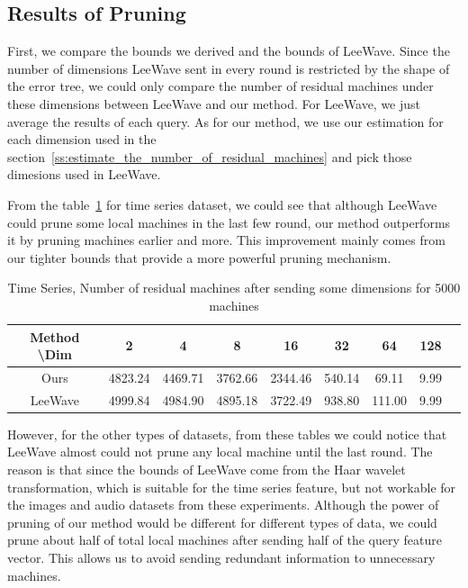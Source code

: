 

\subsection{Results of Pruning} %
\label{sub:results_of_pruning}

First, we compare the bounds we derived and the bounds of LeeWave.  Since the number of dimensions LeeWave sent in every round is restricted by the shape of the error tree, we could only compare the number of residual machines under these dimensions between LeeWave and our method.  For LeeWave, we just average the results of each query.  As for our method, we use our estimation for each dimension used in the section~\ref{ss:estimate_the_number_of_residual_machines} and pick those dimesions used in LeeWave.

From the table~\ref{table:time} for time series dataset, we could see that although LeeWave could prune some local machines in the last few round, our method outperforms it by pruning machines earlier and more.  This improvement mainly comes from our tighter bounds that provide a more powerful pruning mechanism.

\begin{table}[H]\begin{center}
\caption{Time Series, Number of residual machines after sending some dimensions for 5000 machines}\label{table:time}
\begin{tabular}{|c|c|c|c|c|c|c|c|c|}
\hline 
Method \textbackslash Dim & 2 & 4 & 8 & 16 & 32 & 64 & 128\\ \hline \hline
Ours & 4823.24 & 4469.71 & 3762.66 & 2344.46 & 540.14 & 69.11 & 9.99 \\ \hline
LeeWave & 4999.84 & 4984.90 & 4895.18 & 3722.49 & 938.80 & 111.00 & 9.99 \\ \hline
\end{tabular}
\end{center}\end{table}

However, for the other types of datasets, from these tables we could notice that LeeWave almost could not prune any local machine until the last round.  The reason is that since the bounds of LeeWave come from the Haar wavelet transformation, which is suitable for the time series feature, but not workable for the images and audio datasets from these experiments.  Although the power of pruning of our method would be different for different types of data, we could prune about half of total local machines after sending half of the query feature vector.  This allows us to avoid sending redundant information to unnecessary machines.


